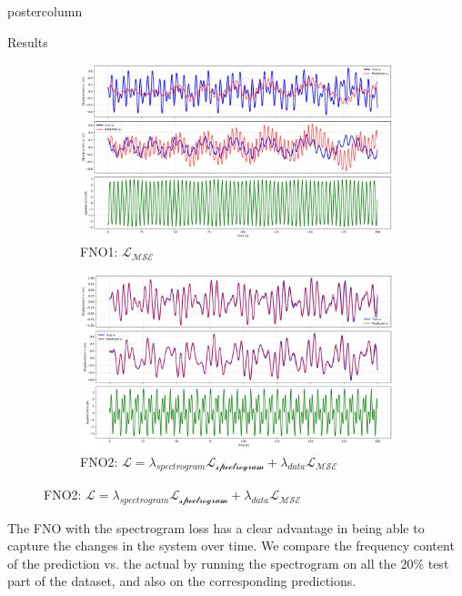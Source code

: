 \documentclass[mathserif]{beamer}
\begin{document}
\begin{frame}
\begin{columns}
\begin{beamercolorbox}[center,wd=\textwidth]{postercolumn}
\begin{minipage}[T]{.95\linewidth}
{\begin{block}{Results}
\begin{figure}
     \centering
     \begin{subfigure}[b]{0.49\linewidth}
         \centering
         \includegraphics[width=1\linewidth]{figures/0039_0000_TFNO_2dof_nlinear_MSE.png}
         \caption{FNO1: $\mathcal{L_{\text{MSE}}}$}
         \label{fig:y equals x}
     \end{subfigure}
     \hfill
     \begin{subfigure}[b]{0.49\linewidth}
         \centering
         \includegraphics[width=1\linewidth]{figures/TFNO_2dof_nlinear_softening_k1_spectral.png}
         \caption{FNO2: $\mathcal{L} = \lambda_{spectrogram}\mathcal{L_{\text{spectrogram}}} + \lambda_{data} \mathcal{L_{\text{MSE}}}$}
         \label{fig:three sin x}
     \end{subfigure}
\end{figure}

The FNO with the spectrogram loss has a clear advantage in being able to capture the changes in the system over time. We compare the frequency content of the prediction vs. the actual by running the spectrogram on all the 20\% test part of the dataset, and also on the corresponding predictions. 




\end{block}}
\end{minipage}
\end{beamercolorbox}
\end{columns}
\end{frame}
\end{document}
